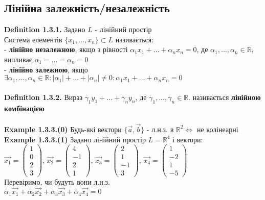 \documentclass[a4paper, 14pt]{extarticle}
\def\defin#1{\textbf{Definition {#1}}}
\def\ex#1{\textbf{Example {#1}}}
\begin{document}
	\subsection{Лінійна залежність/незалежність}
	\defin{1.3.1.} Задано $L$ - лінійний простір\\
	Система елементів $\{x_1, \dots, x_n\} \subset L$ називається:\\
	- \textbf{лінійно незалежною}, якщо з рівності $\alpha_1 x_1 + \dots + \alpha_n x_n = 0$, де $\alpha_1, \dots, \alpha_n \in \mathbb{R}$, випливає $\alpha_1 = \dots = \alpha_n = 0$\\
	- \textbf{лінійно залежною}, якщо $\exists \alpha_1, \dots, \alpha_n \in \mathbb{R}: |\alpha_1| + \dots + |\alpha_n| \neq 0: \alpha_1 x_1 + \dots + \alpha_n x_n = 0$\\
	\\
	\defin{1.3.2.} Вираз $\gamma_1 y_1 + \dots + \gamma_n y_n$, де $\gamma_1, \dots, \gamma_n \in \mathbb{R}$. називається \textbf{лінійною комбінацією}\\
	\\
	\ex{1.3.3.(0)} Будь-які вектори $\{\vec{a}, \vec{b} \}$ - л.н.з. в $\mathbb{R}^2 \iff $ не колінеарні\\
	\ex{1.3.3.(1)} Задано лінійний простір $L = \mathbb{R}^4$ і вектори:\\
	$\vec{x_1} =\begin{pmatrix} 1\\ 0\\ 2\\ 3 \end{pmatrix} $, $\vec{x_2} =\begin{pmatrix} 4\\ -1\\ 2\\ 1 \end{pmatrix} $, $\vec{x_3} =\begin{pmatrix} 2\\ 1\\ -1\\ 3 \end{pmatrix} $, $\vec{x_4} =\begin{pmatrix} 1\\ -2\\ 1\\ -5 \end{pmatrix}$\\
	Перевіримо, чи будуть вони л.н.з.\\
	$\alpha_1 \vec{x_1} + \alpha_2 \vec{x_2} + \alpha_3 \vec{x_3} + \alpha_4 \vec{x_4} = 0$\\
\end{document}
